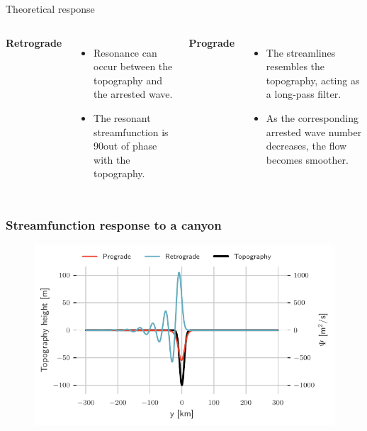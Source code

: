 \documentclass{beamer}
\begin{document}
\begin{frame}{Theoretical response}
\begin{columns}[t]
\textbf{Retrograde}
\begin{itemize}
    \item Resonance can occur between the topography and the arrested wave.
    \item The resonant streamfunction is 90\textdegree out of phase with the topography.
\end{itemize}

\textbf{Prograde}
\begin{itemize}
    \item The streamlines resembles the topography, acting as a long-pass filter.
    \item As the corresponding arrested wave number decreases, the flow becomes smoother.
\end{itemize}

\end{columns}
\end{frame}

\begin{frame}
\frametitle{Streamfunction response to a canyon}
\begin{figure}
\centering
\includegraphics[width=\textwidth]{figures/unstratified_psi(y).pdf}
\end{figure}
\end{frame}
\end{document}
